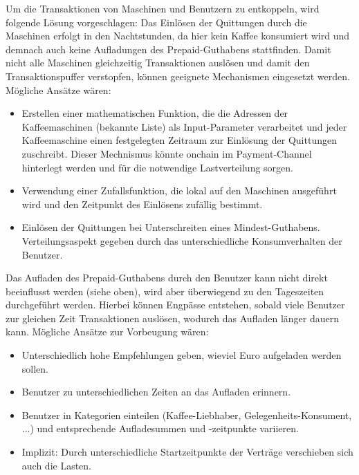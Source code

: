 Um die Transaktionen von Maschinen und Benutzern zu entkoppeln, wird folgende Lösung vorgeschlagen: Das Einlösen der Quittungen durch die Maschinen erfolgt in den Nachtstunden, da hier kein Kaffee konsumiert wird und demnach auch keine Aufladungen des Prepaid-Guthabens stattfinden. Damit nicht alle Maschinen gleichzeitig Transaktionen auslösen und damit den Transaktionspuffer verstopfen, können geeignete Mechanismen eingesetzt werden. Mögliche Ansätze wären:
\begin{itemize}
  \item Erstellen einer mathematischen Funktion, die die Adressen der Kaffeemaschinen (bekannte Liste) als Input-Parameter verarbeitet und jeder Kaffeemaschine einen festgelegten Zeitraum zur Einlösung der Quittungen zuschreibt. Dieser Mechnismus könnte onchain im Payment-Channel hinterlegt werden und für die notwendige Lastverteilung sorgen.
  \item Verwendung einer Zufallsfunktion, die lokal auf den Maschinen ausgeführt wird und den Zeitpunkt des Einlösens zufällig bestimmt.
  \item Einlösen der Quittungen bei Unterschreiten eines Mindest-Guthabens. Verteilungsaspekt gegeben durch das unterschiedliche Konsumverhalten der Benutzer.
\end{itemize}

Das Aufladen des Prepaid-Guthabens durch den Benutzer kann nicht direkt beeinflusst werden (siehe oben), wird aber überwiegend zu den Tageszeiten durchgeführt werden. Hierbei können Engpässe entstehen, sobald viele Benutzer zur gleichen Zeit Transaktionen auslösen, wodurch das Aufladen länger dauern kann. Mögliche Ansätze zur Vorbeugung wären:
\begin{itemize}
  \item Unterschiedlich hohe Empfehlungen geben, wieviel Euro aufgeladen werden sollen.
  \item Benutzer zu unterschiedlichen Zeiten an das Aufladen erinnern.
  \item Benutzer in Kategorien einteilen (Kaffee-Liebhaber, Gelegenheits-Konsument, ...) und entsprechende Aufladesummen und -zeitpunkte variieren.
  \item Implizit: Durch unterschiedliche Startzeitpunkte der Verträge verschieben sich auch die Lasten.
\end{itemize}


